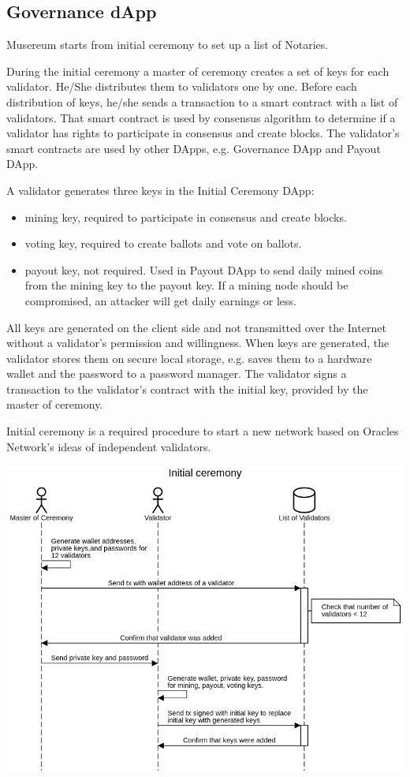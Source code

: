 \documentclass[12pt]{report}
\begin{document}
\subsection{Governance dApp}
\label{tech-apps-governance}
\begin{multicols}{2}
Musereum starts from initial ceremony to set up a list of Notaries.

During the initial ceremony a master of ceremony creates a set of keys for each validator. He/She distributes them to validators one by one. Before each distribution of keys, he/she sends a transaction to a smart contract with a list of validators. That smart contract is used by consensus algorithm to determine if a validator has rights to participate in consensus and create blocks. The validator’s smart contracts are used by other DApps, e.g. Governance DApp and Payout DApp.

A validator generates three keys in the Initial Ceremony DApp:
\begin{itemize}
	\item mining key, required to participate in consensus and create blocks.
	\item voting key, required to create ballots and vote on ballots.
	\item payout key, not required. Used in Payout DApp to send daily mined coins from the mining key to the payout key. If a mining node should be compromised, an attacker will get daily earnings or less.
\end{itemize}

All keys are generated on the client side and not transmitted over the Internet without a validator’s permission and willingness. When keys are generated, the validator stores them on secure local storage, e.g. saves them to a hardware wallet and the password to a password manager. The validator signs a transaction to the validator’s contract with the initial key, provided by the master of ceremony.

Initial ceremony is a required procedure to start a new network based on Oracles Network’s ideas of independent validators.
\end{multicols}

\includegraphics[width=\textwidth]{initial}
\end{document}
